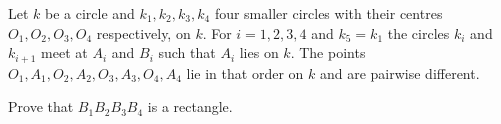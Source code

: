 Let $ k$ be a circle and $ k_{1},k_{2},k_{3},k_{4}$ four smaller circles with their centres $ O_{1},O_{2},O_{3},O_{4}$ respectively, on $ k$. For $ i = 1,2,3,4$ and $ k_{5}= k_{1}$ the circles $ k_{i}$ and $ k_{i+1}$ meet at $ A_{i}$ and $ B_{i}$ such that $ A_{i}$ lies on $ k$. The points $ O_{1},A_{1},O_{2},A_{2},O_{3},A_{3},O_{4},A_{4}$ lie in that order on $ k$ and are pairwise different.

Prove that $ B_{1}B_{2}B_{3}B_{4}$ is a rectangle.
